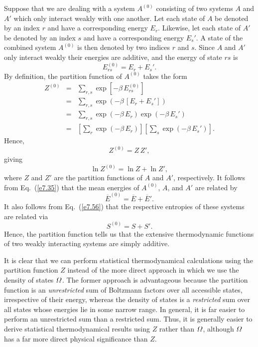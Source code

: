 Suppose that we are dealing with a system $A^{(0)}$ consisting of
two systems $A$ and $A'$ which only interact weakly with one another. Let each
state of $A$ be denoted by an index $r$ and have a  corresponding energy $E_r$. 
Likewise, let each state of $A'$ be denoted by an index $s$ and have a corresponding
energy $E_{s}'$. A state of the combined system $A^{(0)}$ is then denoted
by two indices $r$ and $s$. Since $A$ and $A'$ only interact weakly their
energies are additive, and the energy of state $rs$ is 
\begin{equation}
E_{rs}^{(0)} = E_r +E_s'.
\end{equation}
By definition, the partition function of $A^{(0)}$ takes the form
\begin{eqnarray}
Z^{(0)} &=& \sum_{r,s} \exp[-\beta \,E_{rs}^{(0)}]\nonumber\\[0.5ex]
 	&=& \sum_{r,s} \exp(-\beta\,[E_r+E_s'])\nonumber\\[0.5ex]
	&=& \sum_{r,s} \exp(-\beta\, E_r) \exp(-\beta \,E_s')\nonumber\\[0.5ex]
	&=& \left[\sum_r \exp(-\beta \,E_r)\right]\left[\sum_s
\exp(-\beta\, E_s')\right].
\end{eqnarray}
Hence,
\begin{equation}
Z^{(0)} = Z\, Z',
\end{equation}
giving
\begin{equation}
\ln Z^{(0)} = \ln Z + \ln Z',
\end{equation}
where $Z$ and $Z'$ are the partition functions of $A$ and $A'$, respectively. 
It follows from Eq.~(\ref{e7.35}) that the mean energies of $A^{(0)}$, $A$, and $A'$
are related by
\begin{equation}
\overline{E}^{(0)} = \overline{E} +\overline{E}'.
\end{equation}
It also follows from Eq.~(\ref{e7.56}) that the respective entropies of these systems
are related via
\begin{equation}\label{e7.62}
S^{(0)} = S + S'.
\end{equation}
Hence, the partition function tells us that the extensive thermodynamic
functions of two weakly interacting systems are simply additive.

It is clear that we can perform statistical thermodynamical calculations using
the partition function $Z$ instead of the more direct approach in which  we use the
density of states ${\mit\Omega}$. The former
approach  is advantageous because the partition function
is an {\em unrestricted}\/ sum of Boltzmann factors over all 
accessible states,
irrespective of their energy, whereas the
density of states is a {\em restricted}\/ sum over all states whose energies
lie in some narrow range. In general, it is far easier to perform an unrestricted
sum than a restricted sum. Thus, it is generally easier to derive
statistical thermodynamical results using $Z$ rather than ${\mit\Omega}$, although 
${\mit\Omega}$ has a far more direct physical significance than $Z$. 


